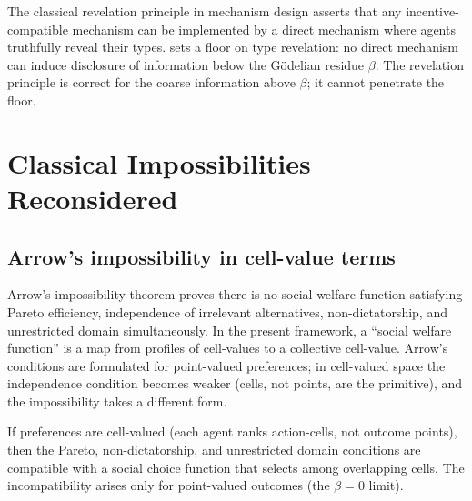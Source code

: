 \documentclass[twocolumn,11pt,a4paper]{article}
\begin{document}
\begin{remark}
\label{rem:revelation}
The classical revelation principle in mechanism design \cite{myerson1979}
asserts that any incentive-compatible mechanism can be implemented by a
direct mechanism where agents truthfully reveal their types.
 sets a floor on type revelation: no direct
mechanism can induce disclosure of information below the G\"odelian
residue $\beta$.  The revelation principle is correct for the coarse
information above $\beta$; it cannot penetrate the floor.
\end{remark}

\section{Classical Impossibilities Reconsidered}
\label{sec:impossibilities}

\subsection{Arrow's impossibility in cell-value terms}
\label{sec:arrow}

Arrow's impossibility theorem \cite{arrow1951} proves there is no social
welfare function satisfying Pareto efficiency, independence of irrelevant
alternatives, non-dictatorship, and unrestricted domain simultaneously.
In the present framework, a ``social welfare function'' is a map from
profiles of cell-values to a collective cell-value.  Arrow's conditions
are formulated for point-valued preferences; in cell-valued space the
independence condition becomes weaker (cells, not points, are the
primitive), and the impossibility takes a different form.

\begin{proposition}
\label{prop:arrowcell}
If preferences are cell-valued (each agent ranks action-cells, not
outcome points), then the Pareto, non-dictatorship, and unrestricted
domain conditions are compatible with a social choice function that
selects among overlapping cells.  The incompatibility arises only for
point-valued outcomes (the $\beta=0$ limit).
\end{proposition}
\end{document}
